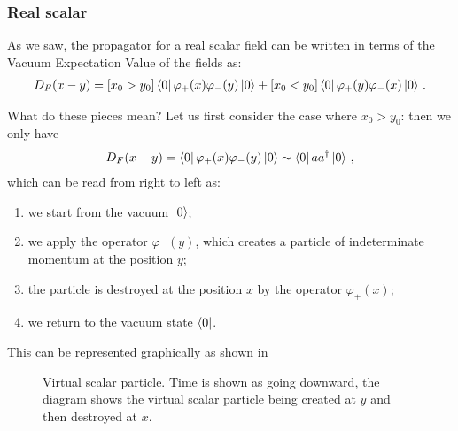 \documentclass[main.tex]{subfiles}
\begin{document}
\subsubsection{Real scalar}

As we saw, the propagator for a real scalar field can be written in terms of the Vacuum Expectation Value of the fields as:
%
\begin{align}
D_F(x-y) = [x_0 > y_0 ] \bra{0} \varphi_+ (x) \varphi_{-} (y) \ket{0}
+ [x_0 < y_0 ] \bra{0}\varphi_{+} (y) \varphi_{-}(x) \ket{0}
\,.
\end{align}

What do these pieces mean? Let us first consider the case where \(x_0 > y_0 \): then we only have 
%
\begin{align}
D_F (x-y) = \bra{0} \varphi_{+} (x) \varphi_{-} (y) \ket{0} \sim \bra{0} a a ^\dag \ket{0}
\,,
\end{align}
%
which can be read from right to left as: 
\begin{enumerate}
    \item we start from the vacuum \(\ket{0}\);
    \item we apply the operator \(\varphi_{-} (y)\), which creates a particle of indeterminate momentum at the position \(y\);
    \item the particle is destroyed at the position \(x\) by the operator \(\varphi_{+}(x)\);
    \item we return to the vacuum state \(\bra{0}\). 
\end{enumerate}

This can be represented graphically as shown in 

\begin{figure}[ht]
\centering
{}
\caption{Virtual scalar particle. Time is shown as going downward, the diagram shows the virtual scalar particle being created at \(y\) and then destroyed at \(x\).}
\label{fig:virtual-scalar-particle-diagram-1}
\end{figure}
\end{document}
